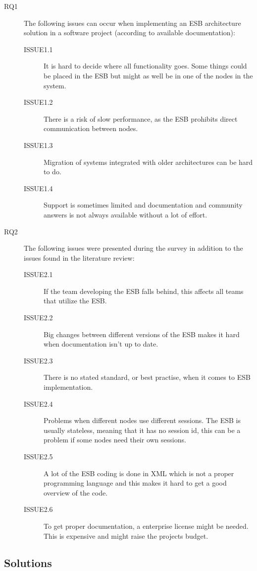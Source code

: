 \documentclass{llncs}
\begin{document}
\begin{description}

\item[RQ1] The following issues can occur when implementing an ESB architecture solution in a software project (according to available documentation):
\begin{description}
\item[ISSUE1.1] It is hard to decide where all functionality goes. Some things could be placed in the ESB but might as well be in one of the nodes in the system.
\item[ISSUE1.2] There is a risk of slow performance, as the ESB prohibits direct communication between nodes.
\item[ISSUE1.3] Migration of systems integrated with older architectures can be hard to do.
\item[ISSUE1.4] Support is sometimes limited and documentation and community answers is not always available without a lot of effort.
\end{description}

\item[RQ2] The following issues were presented during the survey in addition to the issues found in the literature review:
\begin{description}
\item[ISSUE2.1] If the team developing the ESB falls behind, this affects all teams that utilize the ESB.
\item[ISSUE2.2] Big changes between different versions of the ESB makes it hard when documentation isn't up to date.
\item[ISSUE2.3] There is no stated standard, or best practise, when it comes to ESB implementation.
\item[ISSUE2.4] Problems when different nodes use different sessions. The ESB is usually stateless, meaning that it has no session id, this can be a problem if some nodes need their own sessions.
\item[ISSUE2.5] A lot of the ESB coding is done in XML which is not a proper programming language and this makes it hard to get a good overview of the code. 
\item[ISSUE2.6] To get proper documentation, a enterprise license might be needed. This is expensive and might raise the projects budget.
\end{description}
\end{description}

\subsection{Solutions}
\end{document}
